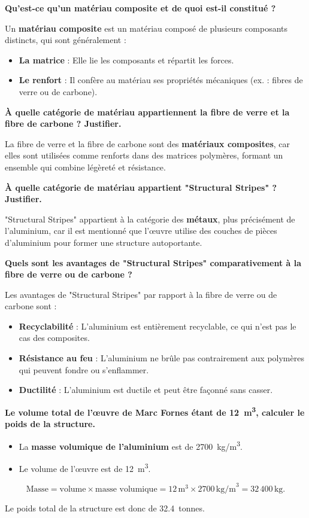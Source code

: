 \documentclass{exam}
\begin{document}
\begin{questions}

\question[1] \textbf{Qu'est-ce qu'un matériau composite et de quoi est-il constitué ?}

Un \textbf{matériau composite} est un matériau composé de plusieurs composants distincts, qui sont généralement :
\begin{itemize}
    \item \textbf{La matrice} : Elle lie les composants et répartit les forces.
    \item \textbf{Le renfort} : Il confère au matériau ses propriétés mécaniques (ex. : fibres de verre ou de carbone).
\end{itemize}

\question[0.5] \textbf{À quelle catégorie de matériau appartiennent la fibre de verre et la fibre de carbone ? Justifier.}

La fibre de verre et la fibre de carbone sont des \textbf{matériaux composites}, car elles sont utilisées comme renforts dans des matrices polymères, formant un ensemble qui combine légèreté et résistance.

\question[0.5] \textbf{À quelle catégorie de matériau appartient "Structural Stripes" ? Justifier.}

"Structural Stripes" appartient à la catégorie des \textbf{métaux}, plus précisément de l'aluminium, car il est mentionné que l'œuvre utilise des couches de pièces d'aluminium pour former une structure autoportante.

\question[1] \textbf{Quels sont les avantages de "Structural Stripes" comparativement à la fibre de verre ou de carbone ?}

Les avantages de "Structural Stripes" par rapport à la fibre de verre ou de carbone sont :
\begin{itemize}
    \item \textbf{Recyclabilité} : L'aluminium est entièrement recyclable, ce qui n'est pas le cas des composites.
    \item \textbf{Résistance au feu} : L'aluminium ne brûle pas contrairement aux polymères qui peuvent fondre ou s'enflammer.
    \item \textbf{Ductilité} : L'aluminium est ductile et peut être façonné sans casser.
\end{itemize}

\question[2] \textbf{Le volume total de l'œuvre de Marc Fornes étant de \SI{12}{m^3}, calculer le poids de la structure.}

\begin{itemize}
    \item La \textbf{masse volumique de l'aluminium} est de \SI{2700}{kg/m^3}.
    \item Le volume de l'œuvre est de \SI{12}{m^3}.
\end{itemize}

\[
\text{Masse} = \text{volume} \times \text{masse volumique} = 12 \, \text{m}^3 \times 2700 \, \text{kg/m}^3 = 32\,400 \, \text{kg}.
\]

Le poids total de la structure est donc de \SI{32.4}{tonnes}.

\end{questions}
\end{document}
